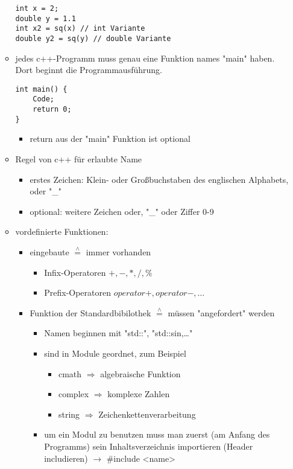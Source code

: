 \documentclass[a4paper]{scrartcl}
\newcommand{\estimates}{\overset{\scriptscriptstyle\wedge}{=}}%
\begin{document}
\begin{itemize}
\begin{itemize}
\begin{verbatim}
int x = 2;
double y = 1.1
int x2 = sq(x) // int Variante
double y2 = sq(y) // double Variante
\end{verbatim}
\item jedes c++-Programm muss genau eine Funktion names "main" haben. Dort beginnt die Programmausführung.
\begin{verbatim}
int main() {
	Code;
	return 0;
}
\end{verbatim}
\begin{itemize}
\item return aus der "main" Funktion ist optional
\end{itemize}
\item Regel von c++ für erlaubte Name
\begin{itemize}
\item erstes Zeichen: Klein- oder Großbuchstaben des englischen Alphabets, oder "\_"
\item optional: weitere Zeichen oder, "\_" oder Ziffer 0-9
\end{itemize}
\item vordefinierte Funktionen:
\begin{itemize}
\item eingebaute $\estimates$ immer vorhanden
\begin{itemize}
\item Infix-Operatoren $+,-,*,/,\%$
\item Prefix-Operatoren $operator+,operator-,\ldots$
\end{itemize}
\item Funktion der Standardbibilothek $\estimates$ müssen "angefordert" werden
\begin{itemize}
\item Namen beginnen mit "std::", "std::sin,\ldots{}"
\item sind in Module geordnet, zum Beispiel
\begin{itemize}
\item cmath $\Rightarrow$ algebraische Funktion
\item complex $\Rightarrow$ komplexe Zahlen
\item string $\Rightarrow$ Zeichenkettenverarbeitung
\end{itemize}
\item um ein Modul zu benutzen muss man zuerst (am Anfang des Programms) sein Inhaltsverzeichnis importieren (Header includieren) $\rightarrow$ \#include <name>
\begin{verbatim}

\end{verbatim}
\end{itemize}
\end{itemize}
\end{itemize}
\end{itemize}
\end{document}
